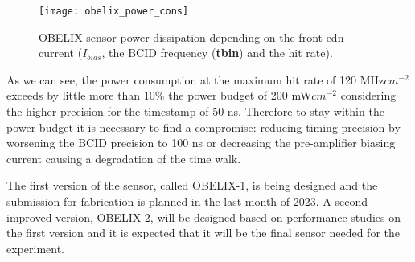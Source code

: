 \begin{figure}[h!]
\centering
\texttt{[image: obelix\_power\_cons]}
\caption{OBELIX sensor power dissipation depending on the front edn current (\textbf{$I_{bias}$}, the BCID frequency (\textbf{tbin}) and the hit rate).}
\label{fig:obelix_power_cons}
\end{figure}

As we can see, the power consumption at the maximum hit rate of 120 MHz$cm^{-2}$ exceeds by little more than 10\% the power budget of 200 mW$cm^{-2}$ considering the higher precision for the timestamp of 50 ns. Therefore to stay within the power budget it is necessary to find a compromise: reducing timing precision by worsening the BCID precision to 100 ns or decreasing the pre-amplifier biasing current causing a degradation of the time walk.


The first version of the sensor, called OBELIX-1, is being designed and the submission for fabrication is planned in the last month of 2023. A second improved version, OBELIX-2, will be designed based on performance studies on the first version and it is expected that it will be the final sensor needed for the experiment.







